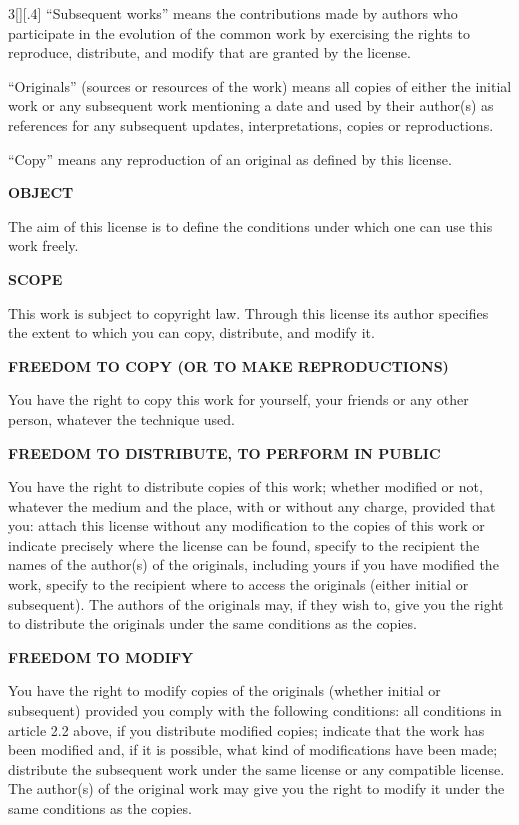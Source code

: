 \documentclass[8pt,a4paper]{article}
\begin{document}
\begin{multicols}{3}[][.4\paperwidth]
``\textrm{Subsequent works}'' means the contributions made by authors who participate in the evolution of the common work by exercising the rights to reproduce, distribute, and modify that are granted by the license.

``\textrm{Originals}'' (sources or resources of the work) means all copies of either the initial work or any subsequent work mentioning a date and used by their author(s) as references for any subsequent updates, interpretations, copies or reproductions.

``\textrm{Copy}'' means any reproduction of an original as defined by this license. 


\textbf{OBJECT}

The aim of this license is to define the conditions under which one can use this work freely. 


\textbf{SCOPE}

This work is subject to copyright law. Through this license its author specifies the extent to which you can copy, distribute, and modify it.


\textbf{FREEDOM TO COPY (OR TO MAKE REPRODUCTIONS)}

You have the right to copy this work for yourself, your friends or any other person, whatever the technique used. 


\textbf{FREEDOM TO DISTRIBUTE, TO PERFORM IN PUBLIC}

You have the right to distribute copies of this work; whether modified or not, whatever the medium and the place, with or without any charge, provided that you:
attach this license without any modification to the copies of this work or indicate precisely where the license can be found,
specify to the recipient the names of the author(s) of the originals, including yours if you have modified the work,
specify to the recipient where to access the originals (either initial or subsequent).
The authors of the originals may, if they wish to, give you the right to distribute the originals under the same conditions as the copies.


\textbf{FREEDOM TO MODIFY}

You have the right to modify copies of the originals (whether initial or subsequent) provided you comply with the following conditions:
all conditions in article 2.2 above, if you distribute modified copies;
indicate that the work has been modified and, if it is possible, what kind of modifications have been made;
distribute the subsequent work under the same license or any compatible license.
The author(s) of the original work may give you the right to modify it under the same conditions as the copies. 



\end{multicols}
\end{document}

